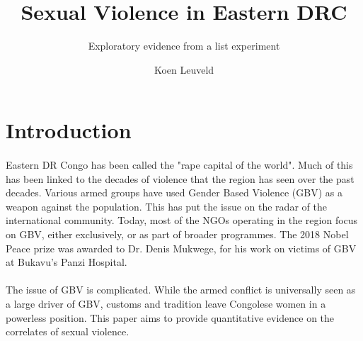 \documentclass[11pt,a4paper]{scrartcl} %
\begin{document}
\author{Koen Leuveld}




\title{Sexual Violence in Eastern DRC}
\subtitle{Exploratory evidence from a list experiment} %

\maketitle



\section*{Introduction}

\paragraph{}
Eastern DR Congo has been called the "rape capital of the world". Much of this has been linked to the decades of violence that the region has seen over the past decades. Various armed groups have used Gender Based Violence (GBV) as a weapon against the population. This has put the issue on the radar of the international community. Today, most of the NGOs operating in the region focus on GBV, either exclusively, or as part of broader programmes. The 2018 Nobel Peace prize was awarded to Dr. Denis Mukwege, for his work on victims of GBV at Bukavu's Panzi Hospital.

\paragraph{}
The issue of GBV is complicated. While the armed conflict is universally seen as a large driver of GBV, customs and tradition leave Congolese women in a powerless position. This paper aims to provide quantitative evidence on the correlates of sexual violence.
\end{document}
